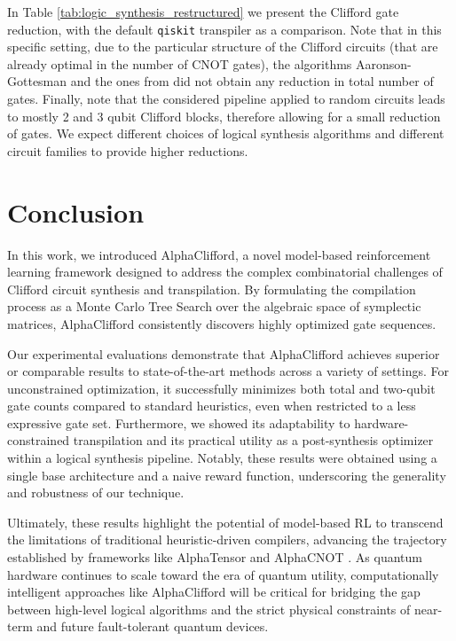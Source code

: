 \documentclass[conference]{IEEEtran}
\begin{document}
In Table \ref{tab:logic_synthesis_restructured} we present the Clifford gate reduction, with the default \texttt{qiskit} transpiler as a comparison. Note that in this specific setting, due to the particular structure of the Clifford circuits (that are already optimal in the number of CNOT gates), the algorithms Aaronson-Gottesman and the ones from \cite{webster} did not obtain any reduction in total number of gates.
Finally, note that the considered pipeline applied to random circuits leads to mostly 2 and 3 qubit Clifford blocks, therefore allowing for a small reduction of gates. We expect different choices of logical synthesis algorithms  and different circuit families to provide higher reductions.

\section{Conclusion}
\label{sec:conc}

In this work, we introduced AlphaClifford, a novel model-based reinforcement learning framework designed to address the complex combinatorial challenges of Clifford circuit synthesis and transpilation. By formulating the compilation process as a Monte Carlo Tree Search over the algebraic space of symplectic matrices, AlphaClifford consistently discovers highly optimized gate sequences. 

Our experimental evaluations demonstrate that AlphaClifford achieves superior or comparable results to state-of-the-art methods across a variety of settings. For unconstrained optimization, it successfully minimizes both total and two-qubit gate counts compared to standard heuristics, even when restricted to a less expressive gate set. Furthermore, we showed its adaptability to hardware-constrained transpilation and its practical utility as a post-synthesis optimizer within a logical synthesis pipeline. Notably, these results were obtained using a single base architecture and a naive reward function, underscoring the generality and robustness of our technique. 

Ultimately, these results highlight the potential of model-based RL to transcend the limitations of traditional heuristic-driven compilers, advancing the trajectory established by frameworks like AlphaTensor \cite{alphatensor_quantum} and AlphaCNOT \cite{cossio2026alphacnotlearningcnotminimization}. As quantum hardware continues to scale toward the era of quantum utility, computationally intelligent approaches like AlphaClifford will be critical for bridging the gap between high-level logical algorithms and the strict physical constraints of near-term and future fault-tolerant quantum devices. 
\end{document}
